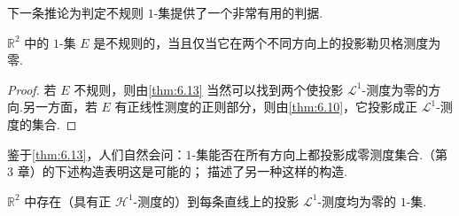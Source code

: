 下一条推论为判定不规则 $1$-集提供了一个非常有用的判据.

\begin{corollary}\label{cor:6.14}
$\mathbb{R}^2$ 中的 $1$-集 $E$ 是不规则的，当且仅当它在两个不同方向上的投影勒贝格测度为零.
\end{corollary}

\begin{proof}
若 $E$ 不规则，则由\cref{thm:6.13} 当然可以找到两个使投影 $\mathscr{L}^1$-测度为零的方向.另一方面，若 $E$ 有正线性测度的正则部分，则由\cref{thm:6.10}，它投影成正 $\mathscr{L}^1$-测度的集合.
\end{proof}

鉴于\cref{thm:6.13}，人们自然会问：$1$-集能否在所有方向上都投影成零测度集合.\textcite{besicovitch1928a}（第 3 章）的下述构造表明这是可能的；\textcite{morgan1935} 描述了另一种这样的构造.

\begin{theorem}\label{thm:6.15}
$\mathbb{R}^2$ 中存在（具有正 $\mathcal{H}^1$-测度的）到每条直线上的投影 $\mathscr{L}^1$-测度均为零的 $1$-集.
\end{theorem}

